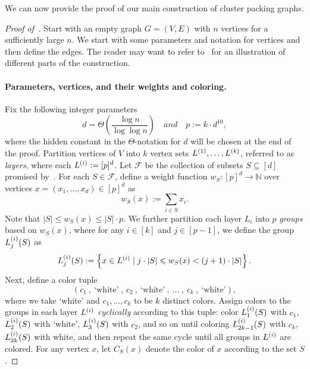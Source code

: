 \documentclass[11pt]{article}
\theoremstyle{definition}
\renewcommand{\leq}{\leqslant}
\newcommand{\card}[1]{\left\vert{#1}\right\vert}
\newcommand{\IN}{\ensuremath{\mathbb{N}}}
\newcommand{\set}[1]{\ensuremath{\left\{ #1 \right\}}}
\begin{document}
We can now provide the proof of our main construction of cluster packing graphs. 

\begin{proof}[Proof of~]
	Start with an empty graph $G=(V,E)$ with $n$ vertices for a sufficiently large $n$. We start with some parameters and notation for vertices and then define the edges. 
	The reader may want to refer to~ for an illustration of different parts of the construction. 
	
	\paragraph{Parameters, vertices, and their weights and coloring.} Fix the following integer parameters 
	 \[
	 d=\Theta({\frac{\log n}{\log\log n}}) \quad and \quad p:=k\cdot d^{10},
	 \]
	 where the hidden constant in the $\Theta$-notation for $d$ will be chosen at the end of the proof. 
	 Partition vertices of $V$ into $k$ vertex sets $L^{(1)},\ldots,L^{(k)}$, referred to as \emph{layers}, where each $L^{(i)} := [p]^d$. Let $\mathcal{F}$ be the collection of subsets $S \subseteq [d]$ 
     promised by~. For each $S \in \mathcal{F}$, define a weight function $w_S: [p]^d \rightarrow \IN$ over vertices $x = (x_1, \ldots, x_d) \in [p]^d$ as
    \[
        w_S(x) := \sum_{i \in S} x_i.
    \]
    Note that $\card{S} \leq w_S(x) \leq \left|S\right|\cdot p$. We further partition each layer $L_i$ into $p$ \emph{groups} based on $w_S(x)$, where for any $i \in [k]$ and $j \in [p-1]$, we
    define the group $L^{(i)}_{j}(S)$ as 
    \[
    	\LijS{i}{j}{S} := \set{x \in \Li{i} \mid  j \cdot |S| \leq w_S(x) < (j+1) \cdot |S|}. 
    \]
   Next, define a color tuple
    \[
        (c_1~,~ \text{`white'}~,~ c_2~,~ \text{`white'}~,~ \ldots~,~ c_k~,~ \text{`white'}),
    \]
    where we take `white' and $c_1,\ldots,c_k$ to be $k$ distinct colors. Assign colors to the groups in each layer $L^{(i)}$ \emph{cyclically} according to this tuple: 
    color $L^{(i)}_{1}(S)$ with $c_1$, $L^{(i)}_{2}(S)$ with `white', $L^{(i)}_{3}(S)$ with $c_2$, and so on until coloring $L^{(i)}_{2k-1}(S)$ with $c_k$, $L^{(i)}_{2k}(S)$ with white, and then repeat the same cycle until all groups in $L^{(i)}$ are colored. 
    For any vertex $x$, let $C_S(x)$ denote the color of $x$ according to the set $S$.


\end{proof}
\end{document}
